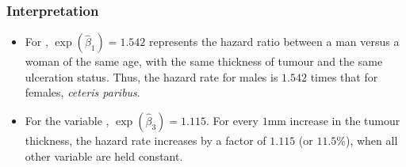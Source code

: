 \documentclass{beamer}
\begin{document}
\begin{frame}
\frametitle{Interpretation}
\begin{itemize}
\item For , $\exp(\widehat{\beta}_1)=1.542$ represents the hazard ratio between a man versus a woman of the same age, with the same thickness of tumour and the same ulceration status. Thus, the hazard rate for males is $1.542$ times that for females, \textit{ceteris paribus}.
\item For the variable  , $\exp(\widehat{\beta}_3)=1.115$. For every $1$mm increase in the tumour thickness, the hazard rate increases by a factor of $1.115$ (or $11.5$\%), when all other variable are held constant. 
\end{itemize}
\end{frame}
% 
% 
% 
\end{document}
